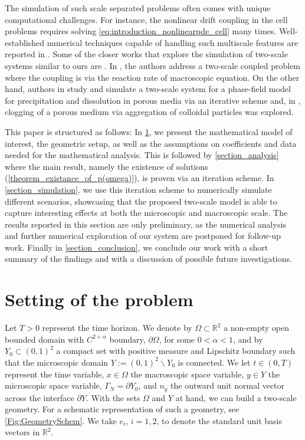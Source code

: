 \documentclass[11pt]{article}
\newcommand{\timeint}{(0,T)}
\begin{document}
The simulation of such scale separated problems often comes with unique computational challenges. 
For instance, the nonlinear drift coupling in the cell problems requires solving \cref{eq:introduction_nonlinearpde_cell} many times. 
Well-established numerical techniques capable of handling such multiscale features are reported in \cite{allaire2005multiscale,henning2014adaptive, abdulle2012heterogeneous,bris2019multiscale}.
 Some of the closer works that explore the simulation of two-scale systems similar to ours are \cite{lind2020semidiscrete,olivares2021two,nikolopoulos2023multiscale}.
 In \cite{lind2020semidiscrete}, the authors address a two-scale coupled  problem where the coupling is via the reaction rate of macroscopic equation.
 On the other hand, authors in \cite{olivares2021two} study and simulate a two-scale system for a phase-field model for precipitation and dissolution in porous media via an iterative scheme and, in  \cite{nikolopoulos2023multiscale}, clogging of a porous medium via aggregation of colloidal particles was explored.
\par This paper is structured as follows:
In \cref{section_setting}, we present the mathematical model of interest, the geometric setup, as well as the assumptions on coefficients and data needed for the mathematical analysis.
This is followed by \cref{section_analysis} where the main result, namely the existence of solutions (\cref{theorem_existance_of_p(omega)}), is proven via an iteration scheme.
In \cref{section_simulation}, we use this iteration scheme to numerically simulate different scenarios, showcasing that the proposed two-scale model is able to capture interesting effects at both the microscopic and macroscopic scale. 
The results reported in this section are only preliminary, as the numerical analysis and further numerical exploration of our system are postponed for follow-up work.  
Finally in \cref{section_conclusion}, we conclude our work with a short summary of the findings and with a discussion of possible future investigations.




\section{Setting of the problem}\label{section_setting}
Let $T>0$ represent the time horizon.
We denote by $\Omega \subset \mathbb{R}^2$ a non-empty open bounded domain with $C^{2+\alpha}$ boundary, $\partial \Omega $, for some $0<\alpha<1$, and by $Y_0 \subset (0,1)^2 $ a compact set with positive measure and Lipschitz boundary such that the microscopic domain $Y:=(0,1)^2\backslash Y_0$ is connected.
We let $t\in \timeint$ represent the time variable, $x\in \Omega$ the macroscopic space variable, $y\in Y$ the microscopic space variable, $\Gamma_N=\partial Y_0$, and $n_y$ the outward unit normal vector across the interface $\partial Y$. 
With the sets $\Omega$ and $Y$ at hand, we can build a two-scale geometry. 
For a schematic representation of such a geometry, see \cref{Fig:GeometrySchem}.
We take $e_i$, $i=1,2$, to denote the standard unit basis vectors in $\mathbb{R}^2$.
\end{document}
